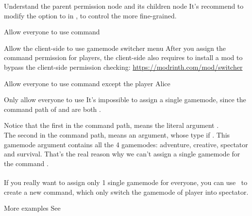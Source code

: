\begin{warn}{Understand the parent permission node and its children node}
    It's recommend to modify the  option to  in , to control the  more fine-grained.
\end{warn}

\begin{example}{Allow everyone to use  command}

    \begin{tips}{Allow the client-side to use gamemode switcher menu}
        After you assign the  command permission for players, the client-side also requires to install a mod to bypass the client-side permission checking: \url{https://modrinth.com/mod/switcher}
    \end{tips}
\end{example}

\begin{example}{Allow everyone to use  command except the player Alice}
    \\
\end{example}

\begin{example}{Only allow everyone to use }
    It's impossible to assign a single gamemode, since the command path of  and  are both .

    Notice that the first  in the command path, means the literal argument .\\
    The second  in the command path, means an argument, whose type if .
    This gamemode argument contains all the 4 gamemodes: adventure, creative, spectator and survival.
    That's the real reason why we can't assign a single gamemode for the command .\\\\
    If you really want to assign only 1 single gamemode for everyone, you can use~ to create a new command, which only switch the gamemode of player into spectator.

\end{example}

\begin{example}{More examples}
    See~
\end{example}
